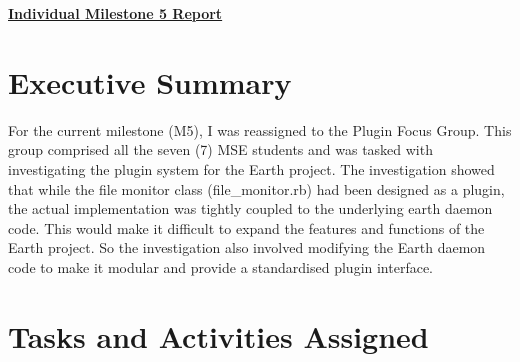 \documentclass{article}
\begin{document}
\pagestyle{headings}

\begin{center}
{\LARGE\textbf{\underline{{Individual Milestone 5 Report}}}}
\end{center}

\section*{Executive Summary}

For the current milestone (M5), I was reassigned to the Plugin Focus Group. This group comprised all the seven (7) MSE students and 
was tasked with investigating the plugin system for the Earth project. The investigation showed that while the file monitor class 
(file\_monitor.rb) had been designed as a plugin, the actual implementation was tightly coupled to the underlying earth daemon code.
This would make it difficult to expand the features and functions of the Earth project. So the investigation also involved modifying
the Earth daemon code to make it modular and provide a standardised plugin interface.


\section*{Tasks and Activities Assigned}
\end{document}
